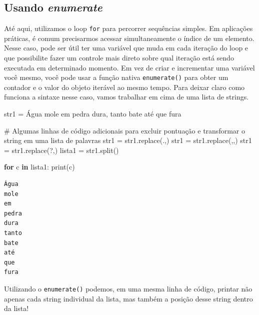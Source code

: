 \documentclass[
  brazilian,
  letterpaper,
  DIV=11,
  numbers=noendperiod]{scrreprt}
\newenvironment{Shaded}{\begin{snugshade}}{\end{snugshade}}
\newcommand{\BuiltInTok}[1]{\textcolor[rgb]{0.00,0.23,0.31}{#1}}
\newcommand{\CommentTok}[1]{\textcolor[rgb]{0.37,0.37,0.37}{#1}}
\newcommand{\ControlFlowTok}[1]{\textcolor[rgb]{0.00,0.23,0.31}{\textbf{#1}}}
\newcommand{\KeywordTok}[1]{\textcolor[rgb]{0.00,0.23,0.31}{\textbf{#1}}}
\newcommand{\NormalTok}[1]{\textcolor[rgb]{0.00,0.23,0.31}{#1}}
\newcommand{\OperatorTok}[1]{\textcolor[rgb]{0.37,0.37,0.37}{#1}}
\newcommand{\StringTok}[1]{\textcolor[rgb]{0.13,0.47,0.30}{#1}}
\begin{document}
\subsection{\texorpdfstring{Usando
\emph{enumerate}}{Usando enumerate}}\label{usando-enumerate}

Até aqui, utilizamos o loop \texttt{for} para percorrer sequências
simples. Em aplicações práticas, é comum precisarmos acessar
simultaneamente o índice de um elemento. Nesse caso, pode ser útil ter
uma variável que muda em cada iteração do loop e que possibilite fazer
um controle mais direto sobre qual iteração está sendo executada em
determinado momento. Em vez de criar e incrementar uma variável você
mesmo, você pode usar a função nativa \texttt{enumerate()} para obter um
contador e o valor do objeto iterável ao mesmo tempo. Para deixar claro
como funciona a sintaxe nesse caso, vamos trabalhar em cima de uma lista
de strings.

\begin{Shaded}
\begin{Highlighting}[]
\NormalTok{str1 }\OperatorTok{=} \StringTok{\textquotesingle{}Água mole em pedra dura, tanto bate até que fura\textquotesingle{}}

\CommentTok{\# Algumas linhas de código adicionais para excluir pontuação e transformar o string em uma lista de palavras}
\NormalTok{str1 }\OperatorTok{=}\NormalTok{ str1.replace(}\StringTok{\textquotesingle{}.\textquotesingle{}}\NormalTok{,}\StringTok{\textquotesingle{}\textquotesingle{}}\NormalTok{)}
\NormalTok{str1 }\OperatorTok{=}\NormalTok{ str1.replace(}\StringTok{\textquotesingle{},\textquotesingle{}}\NormalTok{,}\StringTok{\textquotesingle{}\textquotesingle{}}\NormalTok{)}
\NormalTok{str1 }\OperatorTok{=}\NormalTok{ str1.replace(}\StringTok{\textquotesingle{}?\textquotesingle{}}\NormalTok{,}\StringTok{\textquotesingle{}\textquotesingle{}}\NormalTok{)}
\NormalTok{lista1 }\OperatorTok{=}\NormalTok{ str1.split()}

\ControlFlowTok{for}\NormalTok{ c }\KeywordTok{in}\NormalTok{ lista1:}
    \BuiltInTok{print}\NormalTok{(c)}
\end{Highlighting}
\end{Shaded}

\begin{verbatim}
Água
mole
em
pedra
dura
tanto
bate
até
que
fura
\end{verbatim}

Utilizando o \texttt{enumerate()} podemos, em uma mesma linha de código,
printar não apenas cada string individual da lista, mas também a posição
desse string dentro da lista!
\end{document}
